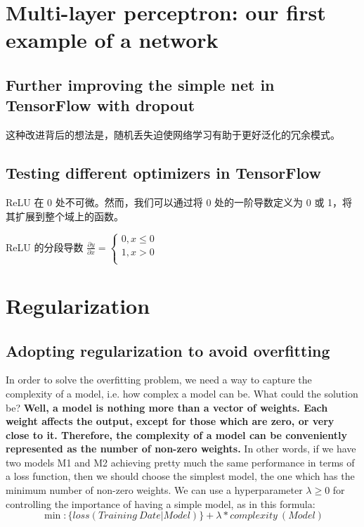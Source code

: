 \section{Multi-layer perceptron: our first example of a network}
\subsection{Further improving the simple net in TensorFlow with dropout}
这种改进背后的想法是，随机丢失迫使网络学习有助于更好泛化的冗余模式。

\subsection{Testing different optimizers in TensorFlow}
ReLU 在 0 处不可微。然而，我们可以通过将 0 处的一阶导数定义为 0 或 1，将其扩展到整个域上的函数。

ReLU 的分段导数
$\frac{\partial y}{\partial x}=
    \begin{cases}
        0, x\leq 0 \\
        1, x> 0    \\
    \end{cases}
$
\section{Regularization}
\subsection{Adopting regularization to avoid overfitting}
In order to solve the overfitting problem, we need a way to capture the complexity of a model, i.e. how complex a model can be. What could the solution be? \textbf{Well, a model is nothing more than a vector of weights. Each weight affects the output, except for those which are zero, or very close to it. Therefore, the complexity of a model can be conveniently represented as the number of non-zero weights.} In other words, if we have two models M1 and M2 achieving pretty much the same performance in terms of a loss function, then we should choose the simplest model, the one which has the minimum number of non-zero weights. We can use a hyperparameter $\lambda \geq 0$ for controlling the importance of having a simple model, as in this formula:
\begin{equation}
    \min:\{loss(Training~Date|Model)\}+\lambda * complexity~(Model)
\end{equation}

